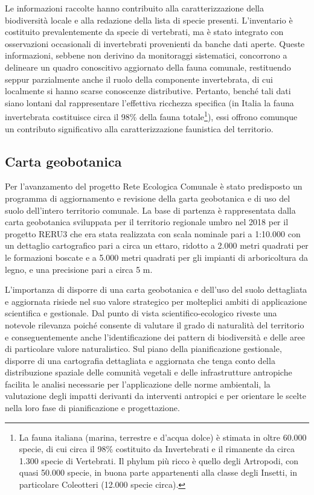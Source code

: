 \documentclass[
]{book}
\begin{document}
Le informazioni raccolte hanno contribuito alla caratterizzazione della biodiversità locale e alla redazione della lista di specie presenti.
L'inventario è costituito prevalentemente da specie di vertebrati, ma è stato integrato con osservazioni occasionali di invertebrati provenienti da banche dati aperte.
Queste informazioni, sebbene non derivino da monitoraggi sistematici, concorrono a delineare un quadro conoscitivo aggiornato della fauna comunale, restituendo seppur parzialmente anche il ruolo della componente invertebrata, di cui localmente si hanno scarse conoscenze distributive.
Pertanto, benché tali dati siano lontani dal rappresentare l'effettiva ricchezza specifica (in Italia la fauna invertebrata costituisce circa il 98\% della fauna totale\footnote{La fauna italiana (marina, terrestre e d'acqua dolce) è stimata in oltre 60.000 specie, di cui circa il 98\% costituito da Invertebrati e il rimanente da circa 1.300 specie di Vertebrati.
  Il phylum più ricco è quello degli Artropodi, con quasi 50.000 specie, in buona parte appartenenti alla classe degli Insetti, in particolare Coleotteri (12.000 specie circa).}), essi offrono comunque un contributo significativo alla caratterizzazione faunistica del territorio.

\subsection{Carta geobotanica}\label{carta-geobotanica}

Per l'avanzamento del progetto Rete Ecologica Comunale è stato predisposto un programma di aggiornamento e revisione della garta geobotanica e di uso del suolo dell'intero territorio comunale.
La base di partenza è rappresentata dalla carta geobotanica sviluppata per il territorio regionale umbro nel 2018 per il progetto RERU3 che era stata realizzata con scala nominale pari a 1:10.000 con un dettaglio cartografico pari a circa un ettaro, ridotto a 2.000 metri quadrati per le formazioni boscate e a 5.000 metri quadrati per gli impianti di arboricoltura da legno, e una precisione pari a circa 5 m.

L'importanza di disporre di una carta geobotanica e dell'uso del suolo dettagliata e aggiornata risiede nel suo valore strategico per molteplici ambiti di applicazione scientifica e gestionale.
Dal punto di vista scientifico-ecologico riveste una notevole rilevanza poiché consente di valutare il grado di naturalità del territorio e conseguentemente anche l'identificazione dei pattern di biodiversità e delle aree di particolare valore naturalistico.
Sul piano della pianificazione gestionale, disporre di una cartografia dettagliata e aggiornata che tenga conto della distribuzione spaziale delle comunità vegetali e delle infrastrutture antropiche facilita le analisi necessarie per l'applicazione delle norme ambientali, la valutazione degli impatti derivanti da interventi antropici e per orientare le scelte nella loro fase di pianificazione e progettazione.
\end{document}

